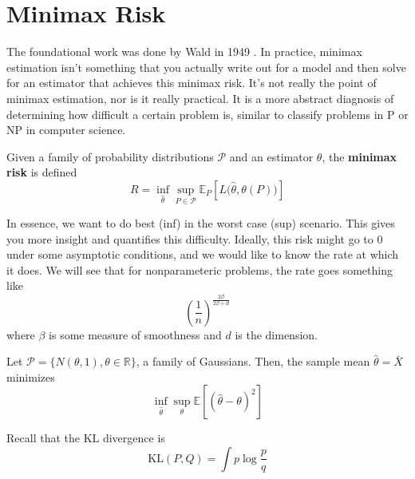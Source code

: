 \section{Minimax Risk}

  The foundational work was done by Wald in 1949 \cite{1949wald}. In practice, minimax estimation isn't something that you actually write out for a model and then solve for an estimator that achieves this minimax risk. It's not really the point of minimax estimation, nor is it really practical. It is a more abstract diagnosis of determining how difficult a certain problem is, similar to classify problems in P or NP in computer science. 

  \begin{definition}
    \label{def:minimax-risk}
    Given a family of probability distributions $\mathscr{P}$ and an estimator $\theta$, the \textbf{minimax risk} is defined 
    \begin{equation}
      R = \inf_{\hat{\theta}} \sup_{P \in \mathscr{P}} \mathbb{E}_P \left[ L \big( \hat{\theta}, \theta(P) \big)\right] 
    \end{equation}
  \end{definition}

  In essence, we want to do best (inf) in the worst case (sup) scenario. This gives you more insight and quantifies this difficulty. Ideally, this risk might go to $0$ under some asymptotic conditions, and we would like to know the rate at which it does. We will see that for nonparameteric problems, the rate goes something like 
  \begin{equation}
    \left( \frac{1}{n} \right)^{\frac{2 \beta}{2 \beta + d}}
  \end{equation}
  where $\beta$ is some measure of smoothness and $d$ is the dimension. 

  \begin{example}[Gaussian]
    \label{ex:gaussian}
    Let $\mathscr{P} = \{N(\theta, 1), \theta \in \mathbb{R}\}$, a family of Gaussians. Then, the sample mean $\hat{\theta} = \bar{X}$ minimizes 
    \begin{equation}
      \inf_{\hat{\theta}} \sup_{\theta} \mathbb{E}[ (\hat{\theta} - \theta)^2 ] 
    \end{equation}
  \end{example}

  \begin{definition}
    \label{def:kullback-leibler-divergence}
    Recall that the KL divergence is 
    \begin{equation}
      \mathrm{KL}(P, Q) = \int p \log \frac{p}{q} 
    \end{equation}
  \end{definition}

